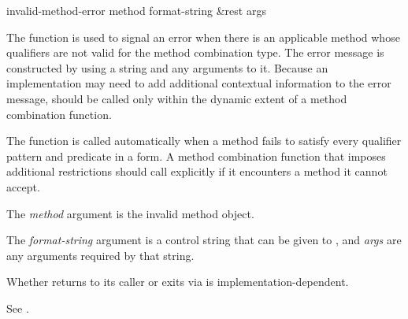 \begin{defun}[Function]
invalid-method-error method format-string &rest args

The function  is used to signal an error
when there is an applicable method whose qualifiers are not valid for
the method combination type.  The error message is constructed by
using a  string and any arguments to it.  Because an
implementation may need to add additional contextual information to
the error message,  should be called only
within the dynamic extent of a method combination function.

The function  is called automatically when a
method fails to satisfy every qualifier pattern and predicate in a
 form.
A method combination function
that imposes additional restrictions should call 
 explicitly if it encounters a method it cannot
accept.





The \emph{method\/} argument is the invalid method object.  

The \emph{format-string\/} argument is a control string that can be
given to , and \emph{args\/} are any arguments required by
that string.


Whether  returns to its caller or exits via
 is implementation-dependent.

See .

\end{defun}


